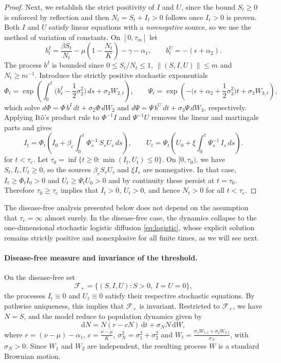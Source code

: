 \documentclass[12pt,a4paper,reqno]{amsart}
\theoremstyle{definition}
\theoremstyle{remark}
\theoremstyle{plain}
\providecommand{\dif}{\mathrm{d}}
\begin{document}
\begin{proof}
Next, we establish the strict positivity of $I$ and $U$, since the bound $S_t\ge 0$ is enforced by reflection and then $N_t=S_t+I_t>0$ follows once $I_t>0$ is proven. Both $I$ and $U$ satisfy linear equations with a \emph{nonnegative} source, so we use the method of variation of constants. On $[0,\tau_m]$ let
$$
b^{I}_t=\frac{\beta S_t}{N_t}-\mu\left(1-\frac{N_t}{K}\right)-\gamma-\alpha_1,
\qquad
b^{U}_t=-(\epsilon+\alpha_2).
$$
The process $b^{I}$ is bounded since $0\le S_t/N_t\le 1$, $\|(S,I,U)\|\leq m$ and $N_t\ge m^{-1}$. Introduce the strictly positive stochastic exponentials
$$
\Phi_t=\exp\left(\int_0^{t}\Big(b^{I}_s-\frac12\sigma_2^2\Big)\,ds
      +\sigma_2 W_{2,t}\right),
\qquad
\Psi_t=\exp\left(-\Big(\epsilon+\alpha_2+\frac12\sigma_3^2\Big)t
      +\sigma_3 W_{3,t}\right),
$$
which solve $d\Phi=\Phi\,b^{I}\,dt+\sigma_2\Phi\,dW_2$ and $d\Psi=\Psi\,b^{U}\,dt+\sigma_3\Psi\,dW_3$, respectively. Applying It\^o's product rule to $\Phi^{-1}I$ and $\Psi^{-1}U$ removes the linear and martingale parts and gives
$$
I_t=\Phi_t\left(I_0+\beta_e \int_0^{t}\Phi_s^{-1}\, S_s U_s\,ds\right),
\qquad
U_t=\Psi_t\left(U_0+\xi \int_0^{t}\Psi_s^{-1}\, I_s\,ds\right).
$$
for $t<\tau_e$. Let $\tau_0=\inf\{t\ge 0:\min(I_t,U_t)\le 0\}$. On $[0,\tau_0)$, we have $S_t,I_t,U_t\ge 0$, so the sources $\beta_e S_sU_s$ and $\xi I_s$ are nonnegative. In that case, $I_t\ge\Phi_tI_0>0$ and $U_t\ge\Psi_tU_0>0$ and by continuity these persist at $t=\tau_0$. Therefore $\tau_0\ge\tau_e$ implies that $I_t>0$, $U_t>0$, and hence $N_t>0$ for all $t<\tau_e$.
\end{proof}

The disease-free analysis presented below does not depend on the assumption that $\tau_e = \infty$ almost surely. In the disease-free case, the dynamics collapse to the one-dimensional stochastic logistic diffusion \eqref{eq:logistic}, whose explicit solution remains strictly positive and nonexplosive for all finite times, as we will see next.

\paragraph{\textbf{Disease-free measure and invariance of the threshold.}}
On the disease-free set
$$\mathcal F_{+}=\{(S,I,U):S>0,\ I=U=0\},$$
the processes $I_t\equiv0$ and $U_t\equiv0$ satisfy their respective stochastic equations. By pathwise uniqueness, this implies that $\mathcal F_{+}$ is invariant. Restricted to $\mathcal F_{+}$, we have $N=S$, and the model reduce to population dynamics given by
\begin{equation}\label{eq:logistic}
\dif N = N(r-cN)\,\dif t+\sigma_NN\,\dif W,
\end{equation}
where $r=(\nu-\mu)-\alpha_1$, $c=\frac{\nu-\mu}{K}$, $\sigma_N^2=\sigma_1^2+\sigma_2^2$ and $W_t=\frac{\sigma_1W_{1,t}+\sigma_2W_{2,t}}{\sigma_N}$, with $\sigma_N>0$. Since $W_1$ and $W_2$ are independent, the resulting process $W$ is a standard Brownian motion.
\end{document}
